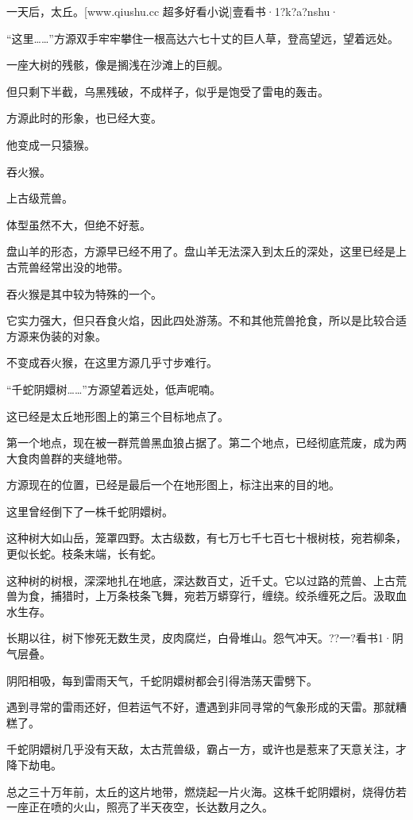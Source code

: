 
\begin{this_body}

一天后，太丘。[www.qiushu.cc 超多好看小说]壹看书·1?k?a?nshu·

“这里……”方源双手牢牢攀住一根高达六七十丈的巨人草，登高望远，望着远处。

一座大树的残骸，像是搁浅在沙滩上的巨舰。

但只剩下半截，乌黑残破，不成样子，似乎是饱受了雷电的轰击。

方源此时的形象，也已经大变。

他变成一只猿猴。

吞火猴。

上古级荒兽。

体型虽然不大，但绝不好惹。

盘山羊的形态，方源早已经不用了。盘山羊无法深入到太丘的深处，这里已经是上古荒兽经常出没的地带。

吞火猴是其中较为特殊的一个。

它实力强大，但只吞食火焰，因此四处游荡。不和其他荒兽抢食，所以是比较合适方源来伪装的对象。

不变成吞火猴，在这里方源几乎寸步难行。

“千蛇阴嬛树……”方源望着远处，低声呢喃。

这已经是太丘地形图上的第三个目标地点了。

第一个地点，现在被一群荒兽黑血狼占据了。第二个地点，已经彻底荒废，成为两大食肉兽群的夹缝地带。

方源现在的位置，已经是最后一个在地形图上，标注出来的目的地。

这里曾经倒下了一株千蛇阴嬛树。

这种树大如山岳，笼罩四野。太古级数，有七万七千七百七十根树枝，宛若柳条，更似长蛇。枝条末端，长有蛇。

这种树的树根，深深地扎在地底，深达数百丈，近千丈。它以过路的荒兽、上古荒兽为食，捕猎时，上万条枝条飞舞，宛若万蟒穿行，缠绕。绞杀缠死之后。汲取血水生存。

长期以往，树下惨死无数生灵，皮肉腐烂，白骨堆山。怨气冲天。??一?看书1·阴气层叠。

阴阳相吸，每到雷雨天气，千蛇阴嬛树都会引得浩荡天雷劈下。

遇到寻常的雷雨还好，但若运气不好，遭遇到非同寻常的气象形成的天雷。那就糟糕了。

千蛇阴嬛树几乎没有天敌，太古荒兽级，霸占一方，或许也是惹来了天意关注，才降下劫电。

总之三十万年前，太丘的这片地带，燃烧起一片火海。这株千蛇阴嬛树，烧得仿若一座正在喷的火山，照亮了半天夜空，长达数月之久。


\end{this_body}
